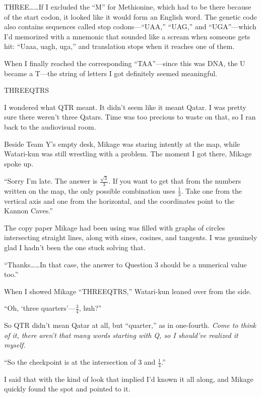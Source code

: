 \documentclass[
    a4paper,
    12pt,
    twoside,
    openany,
    UTF8,
    fontset=windows
]{ctexbook}
\begin{document}
THREE\dots\dots If I excluded the ``M'' for Methionine, which had to be there because of the start codon, it looked like it would form an English word. The genetic code also contains sequences called stop codons---``UAA,'' ``UAG,'' and ``UGA''---which I'd memorized with a mnemonic that sounded like a scream when someone gets hit: ``Uaaa, uagh, uga,'' and translation stops when it reaches one of them.

When I finally reached the corresponding ``TAA''---since this was DNA, the U became a T---the string of letters I got definitely seemed meaningful.

\begin{center}
THREEQTRS
\end{center}

I wondered what QTR meant. It didn't seem like it meant Qatar. I was pretty sure there weren't three Qatars. Time was too precious to waste on that, so I ran back to the audiovisual room.

Beside Team Y's empty desk, Mikage was staring intently at the map, while Watari-kun was still wrestling with a problem. The moment I got there, Mikage spoke up.

``Sorry I'm late. The answer is $\frac{\sqrt{3}}{3}$. If you want to get that from the numbers written on the map, the only possible combination uses $\frac{1}{3}$. Take one from the vertical axis and one from the horizontal, and the coordinates point to the Kannon Caves.''

The copy paper Mikage had been using was filled with graphs of circles intersecting straight lines, along with sines, cosines, and tangents. I was genuinely glad I hadn't been the one stuck solving that.

``Thanks\dots\dots In that case, the answer to Question 3 should be a numerical value too.''

When I showed Mikage ``THREEQTRS,'' Watari-kun leaned over from the side.

``Oh, `three quarters'---$\frac{3}{4}$, huh?''

So QTR didn't mean Qatar at all, but ``quarter,'' as in one-fourth. \textit{Come to think of it, there aren't that many words starting with Q, so I should've realized it myself.}

``So the checkpoint is at the intersection of 3 and $\frac{1}{4}$.''

I said that with the kind of look that implied I'd known it all along, and Mikage quickly found the spot and pointed to it.
\end{document}
